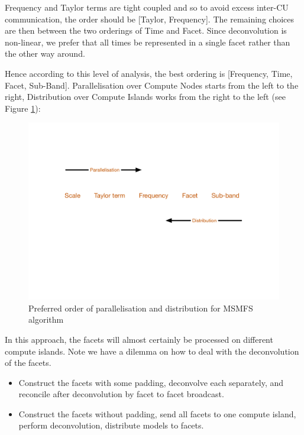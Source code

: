 \documentclass[11pt,a4paper]{article}
\begin{document}
Frequency and Taylor terms are tight coupled and so to avoid excess inter-CU communication, the order should be [Taylor, Frequency]. The remaining choices are then between the two orderings of Time and Facet. Since deconvolution is non-linear, we prefer that all times be represented in a single facet rather than the other way around.

Hence according to this level of analysis, the best ordering is [Frequency, Time, Facet, Sub-Band]. Parallelisation over Compute Nodes starts from the left to the right, Distribution over Compute Islands works from the right to the left (see Figure \ref{fig:order}):

\begin{figure}[htb]
  \centering
  \includegraphics[width=\textwidth]{./MSMFS_Order.pdf}
  \caption{Preferred order of parallelisation and distribution for MSMFS algorithm}
  \label{fig:order}
\end{figure}

In this approach, the facets will almost certainly be processed on different compute islands. Note we have a dilemma on how to deal with the deconvolution of the facets.

\begin{itemize}	
\item Construct the facets with some padding, deconvolve each separately, and reconcile after deconvolution by facet to facet broadcast.
\item Construct the facets without padding, send all facets to one compute island, perform deconvolution, distribute models to facets. 
\end{itemize}
\end{document}
